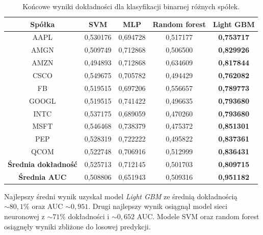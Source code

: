 \documentclass[a4paper, twoside, 11pt, openright]{article}
\begin{document}
 \begin{table}[H]
    \centering
    \begin{tabular}{|c|c|c|c|c|}
    \hline
        \textbf{Spółka} & \textbf{SVM} &  \textbf{MLP}  &  \textbf{Random forest}  &  \textbf{Light GBM} \\ \hline
AAPL   &  0,530176 & 0,694728  & 0,517177 & \textbf{0,753717}\\ \hline
AMGN   &  0,509749 &  0,712868 & 0,506500 &  \textbf{0,829926} \\ \hline
AMZN   &  0,494893 & 0,712868 & 0,634609 & \textbf{0,817844} \\ \hline
CSCO   &  0,549675 &  0,705782 & 0,494429 &  \textbf{0,762082} \\ \hline
FB     &  0,519515 & 0,697206 & 0,556657 & \textbf{0,789773} \\ \hline
GOOGL  &  0,519515 &  0,741422 & 0,496635 & \textbf{0,793680} \\ \hline
INTC   &  0,537175 & 0,689059  & 0,470260 & \textbf{0,793680} \\ \hline
MSFT   &  0,546468 & 0,738379 & 0,475372 &  \textbf{0,851301}\\ \hline
PEP    &  0,528319 & 0,722222  & 0,495822 & \textbf{0,837361} \\ \hline
QCOM   &  0,522748 &  0,706916 & 0,512999 & \textbf{0,836431} \\ \hline \hline
\textbf{Średnia dokładność} &  0,525713 & 0,712145 & 0,501703 & \textbf{0,809715} \\  \hline  
\textbf{Średnia AUC} &  0,508806 & 0,651943 & 0,509316 & \textbf{0,951182} \\  \hline
    \end{tabular}
    \caption{Końcowe wyniki dokładności dla klasyfikacji binarnej różnych spółek.}
    \label{tab:comparison_final_binary}
\end{table}   

Najlepszy średni wynik uzyskał model \textit{Light GBM} ze średnią dokładnością $\sim 80,1\%$ oraz AUC $\sim 0,951$. Drugi najlepszy wynik osiągnął model sieci neuronowej z $\sim 71\%$ dokładności i $\sim 0,652$ AUC. Modele SVM oraz random forest osiągnęły wyniki zbliżone do losowej predykcji.
\end{document}
